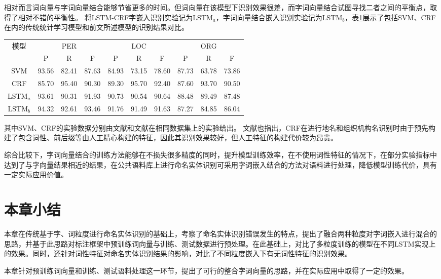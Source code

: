 相对而言词向量与字词向量结合能够节省更多的时间。但词向量在该模型下识别效果很差，而字词向量结合试图寻找二者之间的平衡点，取得了相对不错的平衡性。
将LSTM-CRF字嵌入识别实验记为LSTM$_{a}$，字词向量结合嵌入识别实验记为LSTM$_{b}$，表\ref{tab:comparision}展示了包括SVM、CRF在内的传统统计学习模型和前文所述模型的识别结果对比。
\begin{table}[H]
    \centering
    \begin{tabular}{cccccccccc}
        \toprule
        \multirow{2}{*}{模型} & \multicolumn{3}{c}{PER} & \multicolumn{3}{c}{LOC} & \multicolumn{3}{c}{ORG}\\
        & P & R & F & P & R & F & P & R & F \\
        \midrule
        SVM & 93.56 & 82.41 & 87.63 & 84.93 & 73.15 & 78.60 & 87.73 & 63.78 & 73.86\\
        CRF & 85.70 & 95.40 & 90.30 & 89.30 & 95.70 & 92.40 & 87.60 & 93.70 & 90.50\\
        LSTM$_{a}$ & 93.61 & 90.31 & 91.93 & 90.73 & 90.54 & 90.64 & 88.48 & 89.49 & 87.48\\
        LSTM$_{b}$ & 94.32 & 92.61 & 93.46 & 91.76 & 91.49 & 91.63 & 87.27 & 84.85 & 86.04 \\
        \bottomrule
    \end{tabular}
    \label{tab:comparision}
\end{table}
其中SVM、CRF的实验数据分别由文献和文献在相同数据集上的实验给出。
文献也指出，CRF在进行地名和组织机构名识别时由于预先构建了包含词性、前后缀等由人工精心构建的特征，因此其识别效果较好，但人工特征的构建代价较为昂贵。

综合比较下，字词向量结合的训练方法能够在不损失很多精度的同时，提升模型训练效率，在不使用词性特征的情况下，在部分实验指标中达到了与字向量结果相近的结果，在公共语料库上进行命名实体识别可采用字词嵌入结合的方法对语料进行处理，降低模型训练代价，具有一定实际应用价值。

\section{本章小结}
本章在传统基于字、词粒度进行命名实体识别的基础上，考察了命名实体识别错误发生的特点，提出了融合两种粒度对字词嵌入进行混合的思路，并基于此思路对标注框架中预训练词向量与训练、测试数据进行预处理。在此基础上，对比了多粒度训练的模型在不同LSTM实现上的效果。同时，还针对词性特征对命名实体识别结果的影响，对比了不同粒度嵌入下有无词性特征的识别效果。

本章针对预训练词向量和训练、测试语料处理这一环节，提出了可行的整合字词向量的思路，并在实际应用中取得了一定的效果。
